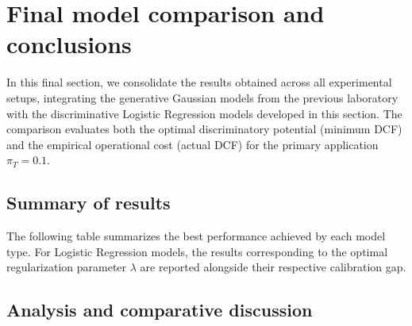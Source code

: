\chapter{Final model comparison and conclusions}

In this final section, we consolidate the results obtained across all experimental setups, integrating the generative Gaussian models from the previous laboratory with the discriminative Logistic Regression models developed in this section. The comparison evaluates both the optimal discriminatory potential (minimum DCF) and the empirical operational cost (actual DCF) for the primary application $\pi_T = 0.1$.

\section{Summary of results}

The following table summarizes the best performance achieved by each model type. For Logistic Regression models, the results corresponding to the optimal regularization parameter $\lambda$ are reported alongside their respective calibration gap.

\begin{table}[h]
\centering
\caption{Overall model comparison ($\pi_T = 0.1$)}
\label{tab:final_comparison}
\end{table}

\section{Analysis and comparative discussion}

